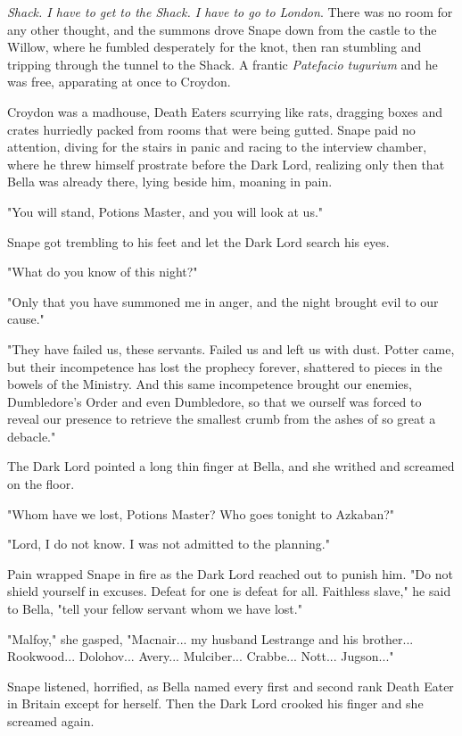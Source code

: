 \emph{Shack. I have to get to the Shack. I have to go to London}. There was no room for any other thought, and the summons drove Snape down from the castle to the Willow, where he fumbled desperately for the knot, then ran stumbling and tripping through the tunnel to the Shack. A frantic \emph{Patefacio tugurium} and he was free, apparating at once to Croydon.

Croydon was a madhouse, Death Eaters scurrying like rats, dragging boxes and crates hurriedly packed from rooms that were being gutted. Snape paid no attention, diving for the stairs in panic and racing to the interview chamber, where he threw himself prostrate before the Dark Lord, realizing only then that Bella was already there, lying beside him, moaning in pain.

"You will stand, Potions Master, and you will look at us."

Snape got trembling to his feet and let the Dark Lord search his eyes.

"What do you know of this night?"

"Only that you have summoned me in anger, and the night brought evil to our cause."

"They have failed us, these servants. Failed us and left us with dust. Potter came, but their incompetence has lost the prophecy forever, shattered to pieces in the bowels of the Ministry. And this same incompetence brought our enemies, Dumbledore's Order and even Dumbledore, so that we ourself was forced to reveal our presence to retrieve the smallest crumb from the ashes of so great a debacle."

The Dark Lord pointed a long thin finger at Bella, and she writhed and screamed on the floor.

"Whom have we lost, Potions Master? Who goes tonight to Azkaban?"

"Lord, I do not know. I was not admitted to the planning."

Pain wrapped Snape in fire as the Dark Lord reached out to punish him. "Do not shield yourself in excuses. Defeat for one is defeat for all. Faithless slave," he said to Bella, "tell your fellow servant whom we have lost."

"Malfoy," she gasped, "Macnair... my husband Lestrange and his brother... Rookwood... Dolohov... Avery... Mulciber... Crabbe... Nott... Jugson..."

Snape listened, horrified, as Bella named every first and second rank Death Eater in Britain except for herself. Then the Dark Lord crooked his finger and she screamed again.

